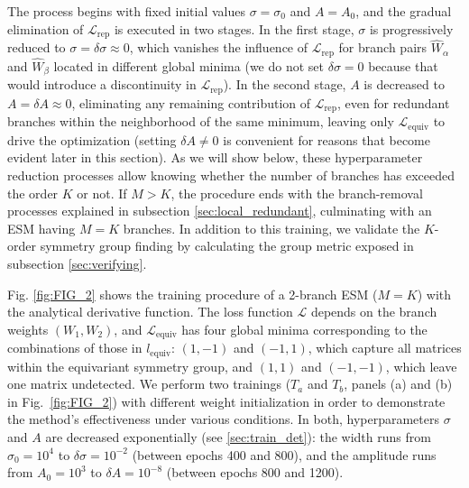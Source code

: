
The process begins with fixed initial values $\sigma = \sigma_0$ and $A = A_0$, and the gradual elimination of $\mathcal{L}_{\mathrm{rep}}$ is executed in two stages. In the first stage, $\sigma$ is progressively reduced to $\sigma = \delta\sigma \approx 0$, which vanishes the influence of $\mathcal{L}_{\mathrm{rep}}$ for branch pairs $\hat{W}_\alpha$ and $\hat{W}_\beta$ located in different global minima (we do not set $\delta\sigma = 0$ because that would introduce a discontinuity in $\mathcal{L}_{\mathrm{rep}}$). In the second stage, $A$ is decreased to $A = \delta A \approx 0$, eliminating any remaining contribution of $\mathcal{L}_{\mathrm{rep}}$, even for redundant branches within the neighborhood of the same minimum, leaving only $\mathcal{L}_{\mathrm{equiv}}$ to drive the optimization (setting $\delta A \neq 0$ is convenient for reasons that become evident later in this section). As we will show below, these hyperparameter reduction processes allow knowing whether the number of branches has exceeded the order $K$ or not. If $M>K$, the procedure ends with the branch-removal processes explained in subsection \ref{sec:local_redundant}, culminating with an ESM having $M=K$ branches. In addition to this training, we validate the $K$-order symmetry group finding by calculating the group metric exposed in subsection \ref{sec:verifying}.




Fig. \ref{fig:FIG_2} shows the training procedure of a 2-branch ESM ($M = K$) with the analytical derivative function. The loss function $\mathcal{L}$ depends on the branch weights $(W_1, W_2)$, and $\mathcal{L}_{\mathrm{equiv}}$ has four global minima corresponding to the combinations of those in $l_{\mathrm{equiv}}$: $(1, -1)$ and $(-1, 1)$, which capture all matrices within the equivariant symmetry group, and $(1, 1)$ and $(-1, -1)$, which leave one matrix undetected. We perform two trainings ($T_a$ and $T_b$, panels (a) and (b) in Fig.~\ref{fig:FIG_2}) with different weight initialization in order to demonstrate the method's effectiveness under various conditions. In both, hyperparameters $\sigma$ and $A$ are decreased exponentially (see \ref{sec:train_det}): the width runs from $\sigma_0 = 10^4$ to $\delta\sigma = 10^{-2}$ (between epochs 400 and 800), and the amplitude runs from $A_0 = 10^3$ to $\delta A = 10^{-8}$ (between epochs 800 and 1200).


